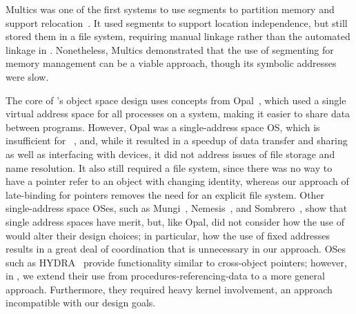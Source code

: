 {    Multics was one of the first systems to use segments to partition memory and
    support relocation~\cite{bensoussan:sosp69,daley:cacm68}. It used segments to
    support location independence, but still stored them in a file system, requiring manual linkage
    rather than the automated linkage in \Twizzler. Nonetheless, Multics demonstrated that the use of
    segmenting for memory management can be a viable approach, though its
    symbolic addresses were slow.

    The core of \Twizzler's object space design uses concepts
    from Opal~\cite{chase:tocs94}, which used a single virtual
    address space for all processes on a system, making it easier to share
    data between programs. However, Opal was a single-address space OS, which is insufficient for
    \NVM~\cite{bittman:plos19,bittman:hotstorage19},
    and, while it resulted in a speedup of data transfer and sharing as well as interfacing with
    devices, it did not address issues of file storage and name resolution. It also
    still required a file
    system, since there was no way to have a pointer refer to an object with changing identity,
    whereas our approach
    of late-binding for pointers
    removes the need for an explicit file system.  Other single-address space
    OSes, such as Mungi~\cite{heiser:scse9314},
    Nemesis~\cite{roscoe:osr94}, and Sombrero~\cite{skousen:ipccc99}, show that
    single address spaces have merit, but, like Opal, did not consider how the use
    of \NVM would alter their design choices; in particular, how the use of fixed addresses
    results in a great deal of coordination that is unnecessary in our approach.
    OSes such as HYDRA~\cite{wulf:cacm74} provide functionality similar to cross-object pointers;
    however, in \Twizzler, we extend their use from procedures-referencing-data to
    a more general approach. Furthermore, they required
    heavy kernel involvement, an approach incompatible with
    our design goals.

}
